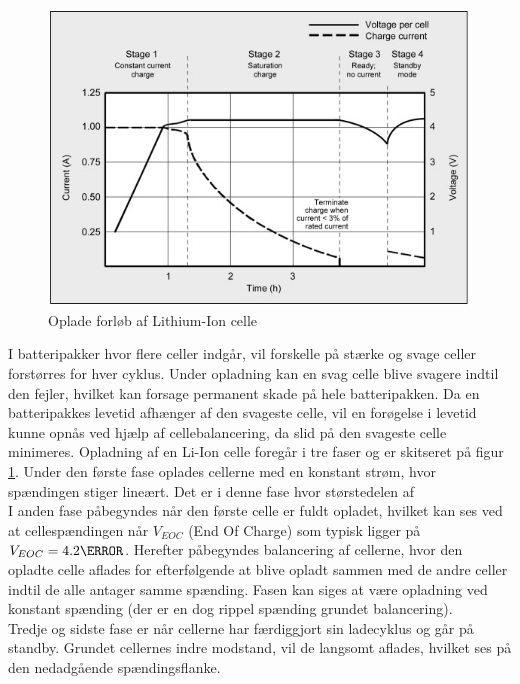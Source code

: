 \begin{figure}[h]
	\centering
	\includegraphics[width=15cm]{billeder/liion_opladning.png}
	\caption{Oplade forløb af Lithium-Ion celle}
	\label{fig:opladning_liion}
\end{figure}
\FloatBlock

I batteripakker hvor flere celler indgår, vil forskelle på stærke og svage celler forstørres for hver cyklus. Under opladning kan en svag celle blive svagere indtil den fejler, hvilket kan forsage permanent skade på hele batteripakken. Da en batteripakkes levetid afhænger af den svageste celle, vil en forøgelse i levetid kunne opnås ved hjælp af cellebalancering, da slid på den svageste celle minimeres. Opladning af en Li-Ion celle foregår i tre faser og er skitseret på figur \ref{fig:opladning_liion}.
Under den første fase oplades cellerne med en konstant strøm, hvor spændingen stiger lineært. Det er i denne fase hvor størstedelen af
\\

I anden fase påbegyndes når den første celle er fuldt opladet, hvilket kan ses ved at cellespændingen når $V_{EOC}$ (End Of Charge) som typisk ligger på $V_{EOC} = 4.2 \volt$. Herefter påbegyndes balancering af cellerne, hvor den opladte celle aflades for efterfølgende at blive opladt sammen med de andre celler indtil de alle antager samme spænding.
Fasen kan siges at være opladning ved konstant spænding (der er en dog rippel spænding grundet balancering).
\\

Tredje og sidste fase er når cellerne har færdiggjort sin ladecyklus og går på standby. Grundet cellernes indre modstand, vil de langsomt aflades, hvilket ses på den nedadgående spændingsflanke.

